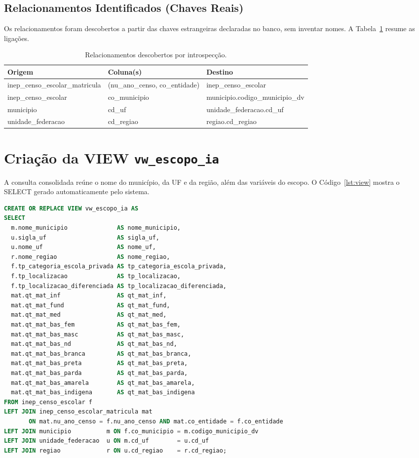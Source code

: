 \documentclass[
    12pt,
    oneside,
    a4paper,
    chapter=TITLE,
    section=TITLE
]{abntex2}
\begin{document}
\subsection{Relacionamentos Identificados (Chaves Reais)}
Os relacionamentos foram descobertos a partir das chaves estrangeiras declaradas no banco, sem
inventar nomes. A Tabela~\ref{tab:chaves} resume as ligações.

\begin{table}[H]
\centering
\caption{Relacionamentos descobertos por introspecção.}
\label{tab:chaves}
\begin{tabular}{lll}
\toprule
\textbf{Origem} & \textbf{Coluna(s)} & \textbf{Destino} \\
\midrule
inep\_censo\_escolar\_matricula & (nu\_ano\_censo, co\_entidade) & inep\_censo\_escolar \\
inep\_censo\_escolar & co\_municipio & municipio.codigo\_municipio\_dv \\
municipio & cd\_uf & unidade\_federacao.cd\_uf \\
unidade\_federacao & cd\_regiao & regiao.cd\_regiao \\
\bottomrule
\end{tabular}
\end{table}

\section{Criação da VIEW \texttt{vw\_escopo\_ia}}
A consulta consolidada reúne o nome do município, da UF e da região, além das variáveis do escopo. O
Código~\ref{lst:view} mostra o SELECT gerado automaticamente pelo sistema.

\begin{lstlisting}[language=SQL, caption={Definição da visão vw\_escopo\_ia.}, label=lst:view]
CREATE OR REPLACE VIEW vw_escopo_ia AS
SELECT
  m.nome_municipio              AS nome_municipio,
  u.sigla_uf                    AS sigla_uf,
  u.nome_uf                     AS nome_uf,
  r.nome_regiao                 AS nome_regiao,
  f.tp_categoria_escola_privada AS tp_categoria_escola_privada,
  f.tp_localizacao              AS tp_localizacao,
  f.tp_localizacao_diferenciada AS tp_localizacao_diferenciada,
  mat.qt_mat_inf                AS qt_mat_inf,
  mat.qt_mat_fund               AS qt_mat_fund,
  mat.qt_mat_med                AS qt_mat_med,
  mat.qt_mat_bas_fem            AS qt_mat_bas_fem,
  mat.qt_mat_bas_masc           AS qt_mat_bas_masc,
  mat.qt_mat_bas_nd             AS qt_mat_bas_nd,
  mat.qt_mat_bas_branca         AS qt_mat_bas_branca,
  mat.qt_mat_bas_preta          AS qt_mat_bas_preta,
  mat.qt_mat_bas_parda          AS qt_mat_bas_parda,
  mat.qt_mat_bas_amarela        AS qt_mat_bas_amarela,
  mat.qt_mat_bas_indigena       AS qt_mat_bas_indigena
FROM inep_censo_escolar f
LEFT JOIN inep_censo_escolar_matricula mat
       ON mat.nu_ano_censo = f.nu_ano_censo AND mat.co_entidade = f.co_entidade
LEFT JOIN municipio          m ON f.co_municipio = m.codigo_municipio_dv
LEFT JOIN unidade_federacao  u ON m.cd_uf        = u.cd_uf
LEFT JOIN regiao             r ON u.cd_regiao    = r.cd_regiao;
\end{lstlisting}
\end{document}
